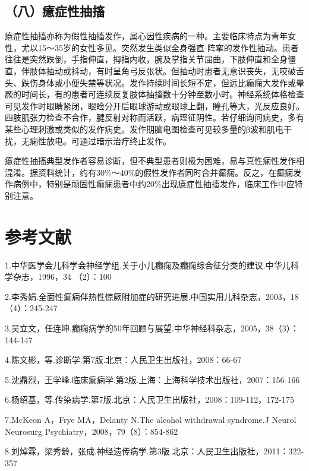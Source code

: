 \subsection{（八）癔症性抽搐}

癔症性抽搐亦称为假性抽搐发作，属心因性疾病的一种。主要临床特点为青年女性，尤以15～35岁的女性多见。突然发生类似全身强直-阵挛的发作性抽动。患者往往是突然跌倒，手指伸直，拇指内收，腕及掌指关节屈曲，下肢伸直和全身僵直，伴肢体抽动或抖动，有时呈角弓反张状。但抽动时患者无意识丧失，无咬破舌头、跌伤身体或小便失禁等状况。发作持续时间长短不定，但远比癫痫大发作或晕厥的时间长，有的患者可连续反复肢体抽搐数十分钟至数小时。神经系统体格检查可见发作时眼睛紧闭，眼睑分开后眼球游动或眼球上翻，瞳孔等大，光反应良好。四肢肌张力检查不合作，腱反射对称而活跃，病理征阴性。若仔细询问病史，多有某些心理刺激或类似的发作病史。发作期脑电图检查可见较多量的β波和肌电干扰，无痫性放电。可通过暗示治疗终止发作。

癔症性抽搐典型发作者容易诊断，但不典型患者则极为困难，易与真性痫性发作相混淆。据资料统计，约有30\%～40\%的假性发作者同时合并癫痫。反之，在癫痫发作病例中，特别是顽固性癫痫患者中约20\%出现癔症性抽搐发作，临床工作中应特别注意。

\protect\hypertarget{text00395.html}{}{}

\section{参考文献}

1.中华医学会儿科学会神经学组.关于小儿癫痫及癫痫综合征分类的建议.中华儿科学杂志，1996，34
（2）：100

2.李秀娟.全面性癫痫伴热性惊厥附加症的研究进展.中国实用儿科杂志，2003，18（4）：245-247

3.吴立文，任连坤.癫痫病学的50年回顾与展望.中华神经科杂志，2005，38（3）：144-147

4.陈文彬，等.诊断学.第7版.北京：人民卫生出版社，2008：66-67

5.沈鼎烈，王学峰.临床癫痫学.第2版.上海：上海科学技术出版社，2007：156-166

6.杨绍基，等.传染病学.第7版.北京：人民卫生出版社，2008：109-112，172-175

7.McKeon A，Frye MA，Delanty N.The alcohol withdrawal syndrome.J Neurol
Neurosurg Psychiatry，2008，79（8）：854-862

8.刘焯霖，梁秀龄，张成.神经遗传病学.第3版.北京：人民卫生出版社，2011：322-357

